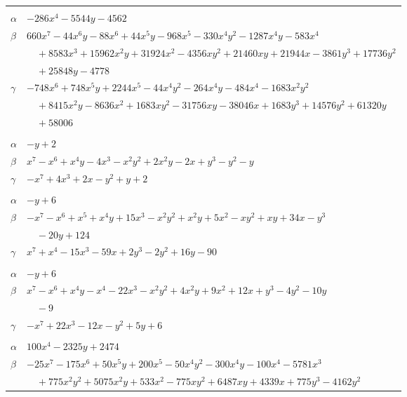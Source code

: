 \documentclass[11pt]{article}
\begin{document}
\begin{longtable}{@{}ll@{}}
\addlinespace[3pt]
\multicolumn{2}{@{}l}{$\{i,j\}=\{17,22\}$, $k_{ij}=2^{4}\cdot 3^{3}$}\\
$\alpha$ & $-286x^{4}-5544y-4562$\\
$\beta$ & $660x^{7}-44x^{6}y-88x^{6}+44x^{5}y-968x^{5}-330x^{4}y^{2}-1287x^{4}y-583x^{4}$\\
 & $\quad +8583x^{3}+15962x^{2}y+31924x^{2}-4356xy^{2}+21460xy+21944x-3861y^{3}+17736y^{2}$\\
 & $\quad +25848y-4778$\\
$\gamma$ & $-748x^{6}+748x^{5}y+2244x^{5}-44x^{4}y^{2}-264x^{4}y-484x^{4}-1683x^{2}y^{2}$\\
 & $\quad +8415x^{2}y-8636x^{2}+1683xy^{2}-31756xy-38046x+1683y^{3}+14576y^{2}+61320y$\\
 & $\quad +58006$\\
\addlinespace[3pt]
\multicolumn{2}{@{}l}{$\{i,j\}=\{18,19\}$, $k_{ij}=2^{2}$}\\
$\alpha$ & $-y+2$\\
$\beta$ & $x^{7}-x^{6}+x^{4}y-4x^{3}-x^{2}y^{2}+2x^{2}y-2x+y^{3}-y^{2}-y$\\
$\gamma$ & $-x^{7}+4x^{3}+2x-y^{2}+y+2$\\
\addlinespace[3pt]
\multicolumn{2}{@{}l}{$\{i,j\}=\{19,27\}$, $k_{ij}=2^{6}\cdot 3$}\\
$\alpha$ & $-y+6$\\
$\beta$ & $-x^{7}-x^{6}+x^{5}+x^{4}y+15x^{3}-x^{2}y^{2}+x^{2}y+5x^{2}-xy^{2}+xy+34x-y^{3}$\\
 & $\quad -20y+124$\\
$\gamma$ & $x^{7}+x^{4}-15x^{3}-59x+2y^{3}-2y^{2}+16y-90$\\
\addlinespace[3pt]
\multicolumn{2}{@{}l}{$\{i,j\}=\{20,25\}$, $k_{ij}=3\cdot 5$}\\
$\alpha$ & $-y+6$\\
$\beta$ & $x^{7}-x^{6}+x^{4}y-x^{4}-22x^{3}-x^{2}y^{2}+4x^{2}y+9x^{2}+12x+y^{3}-4y^{2}-10y$\\
 & $\quad -9$\\
$\gamma$ & $-x^{7}+22x^{3}-12x-y^{2}+5y+6$\\
\addlinespace[3pt]
\multicolumn{2}{@{}l}{$\{i,j\}=\{22,23\}$, $k_{ij}=2\cdot 3^{3}\cdot 11\cdot 13$}\\
$\alpha$ & $100x^{4}-2325y+2474$\\
$\beta$ & $-25x^{7}-175x^{6}+50x^{5}y+200x^{5}-50x^{4}y^{2}-300x^{4}y-100x^{4}-5781x^{3}$\\
 & $\quad +775x^{2}y^{2}+5075x^{2}y+533x^{2}-775xy^{2}+6487xy+4339x+775y^{3}-4162y^{2}$\\

\end{longtable}
\end{document}
